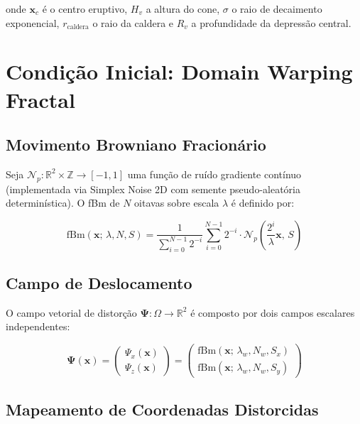 \documentclass[11pt,a4paper]{article}
\begin{document}
onde $\mathbf{x}_c$ é o centro eruptivo, $H_v$ a altura do cone, $\sigma$ o raio de decaimento
exponencial, $r_{\text{caldera}}$ o raio da caldera e $R_v$ a profundidade da depressão central.

\section{Condição Inicial: Domain Warping Fractal}

\subsection{Movimento Browniano Fracionário}

Seja $\mathcal{N}_p : \mathbb{R}^2 \times \mathbb{Z} \to [-1,1]$ uma função de ruído
gradiente contínuo (implementada via Simplex Noise 2D com semente pseudo-aleatória determinística).
O fBm de $N$ oitavas sobre escala $\lambda$ é definido por:

\begin{equation}
  \text{fBm}(\mathbf{x};\, \lambda, N, S)
  = \frac{1}{\sum_{i=0}^{N-1} 2^{-i}}
    \sum_{i=0}^{N-1} 2^{-i} \cdot \mathcal{N}_p\!\left(\frac{2^i}{\lambda}\mathbf{x},\, S\right)
  \label{eq:fbm}
\end{equation}

\subsection{Campo de Deslocamento}

O campo vetorial de distorção $\boldsymbol{\Psi} : \Omega \to \mathbb{R}^2$ é composto por
dois campos escalares independentes:

\begin{equation}
  \boldsymbol{\Psi}(\mathbf{x}) =
  \begin{pmatrix}
    \Psi_x(\mathbf{x}) \\
    \Psi_z(\mathbf{x})
  \end{pmatrix}
  =
  \begin{pmatrix}
    \text{fBm}(\mathbf{x};\, \lambda_w, N_w, S_x) \\
    \text{fBm}(\mathbf{x};\, \lambda_w, N_w, S_y)
  \end{pmatrix}
  \label{eq:psi}
\end{equation}

\subsection{Mapeamento de Coordenadas Distorcidas}
\end{document}

